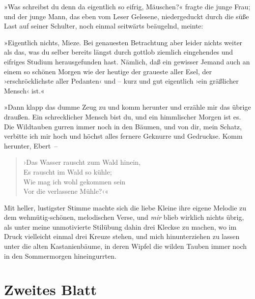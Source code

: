 \tb

»Was schreibst du denn da eigentlich so eifrig, Mäuschen?« fragte
die junge Frau; und der junge Mann, das eben vom Leser Gelesene,
niedergeduckt durch die süße Last auf seiner Schulter, noch einmal
seitwärts beäugelnd, meinte:

»Eigentlich nichts, Mieze. Bei genauesten Betrachtung aber leider
nichts weiter als das, was du selber bereits längst durch gottlob
ziemlich eingehendes und eifriges Studium herausgefunden hast.
Nämlich, daß ein gewisser Jemand auch an einem so schönen Morgen
wie der heutige der graueste aller Esel, der ›erschröcklichste
aller Pedanten‹ und – kurz und gut eigentlich ›ein gräßlicher
Mensch‹ ist.«

»Dann klapp das dumme Zeug zu und komm herunter und erzähle mir das
übrige draußen. Ein schrecklicher Mensch bist du, und ein
himmlischer Morgen ist es. Die Wildtauben gurren immer noch in den
Bäumen, und von dir, mein Schatz, verbitte ich mir hoch und höchst
alles fernere Geknurre und Gedruckse. Komm herunter, Ebert~–

\begin{verse}
›Das Wasser rauscht zum Wald hinein,\\
Es rauscht im Wald so kühle;\\
Wie mag ich wohl gekommen sein\\
Vor die verlassene Mühle?‹«
\end{verse}

Mit heller, lustigster Stimme machte sich die liebe Kleine ihre
eigene Melodie zu dem wehmütig-schönen, melodischen Verse, und
\emph{mir} blieb wirklich nichts übrig, als unter meine
unmotivierte Stilübung dahin drei Kleckse zu machen, wo im Druck
vielleicht einmal drei Kreuze stehen, und mich hinunterziehen zu
lassen unter die alten Kastanienbäume, in deren Wipfel die wilden
Tauben immer noch in den Sommermorgen hineingurrten.

\section{Zweites Blatt}

